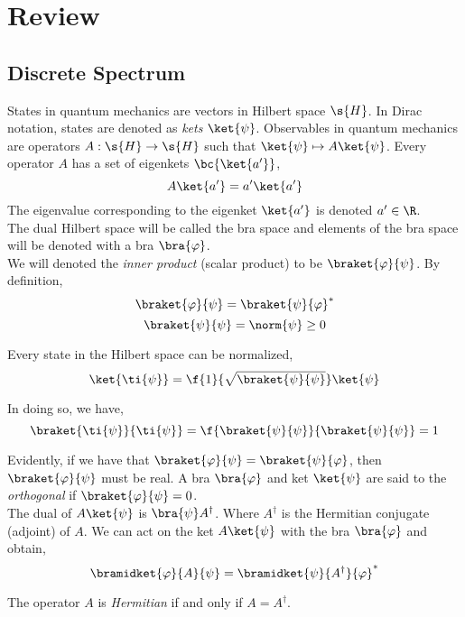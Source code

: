 \documentclass{article}
\begin{document}
\titlePage

\tableOfContents

\disclaimer

\section{Review}

\subsection{Discrete Spectrum}
States in quantum mechanics are vectors in Hilbert space $\s{H}$. In Dirac notation, states are denoted as \textit{kets} $\ket{\psi}$. Observables in quantum mechanics are operators $A : \s{H} \to \s{H}$ such that $\ket{\psi} \mapsto A \ket{\psi}$. Every operator $A$ has a set of eigenkets $\bc{\ket{a'}}$,
\[ A \ket{a'} = a' \ket{a'} \]
The eigenvalue corresponding to the eigenket $\ket{a'}$ is denoted $a' \in \R$. \\

The dual Hilbert space will be called the bra space and elements of the bra space will be denoted with a bra $\bra{\varphi}$.\\

We will denoted the \textit{inner product} (scalar product) to be $\braket{\varphi}{\psi}$. By definition,
\[ \braket{\varphi}{\psi} = \braket{\psi}{\varphi}^{*} \]
\[ \braket{\psi}{\psi} = \norm{\psi} \geq 0 \]

Every state in the Hilbert space can be normalized,
\[ \ket{\ti{\psi}} = \f{1}{\sqrt{\braket{\psi}{\psi}}} \ket{\psi} \]

In doing so, we have,
\[ \braket{\ti{\psi}}{\ti{\psi}} = \f{\braket{\psi}{\psi}}{\braket{\psi}{\psi}} = 1 \]

Evidently, if we have that $\braket{\varphi}{\psi} = \braket{\psi}{\varphi}$, then $\braket{\varphi}{\psi}$ must be real. A bra $\bra{\varphi}$ and ket $\ket{\psi}$ are said to the \textit{orthogonal} if $\braket{\varphi}{\psi} = 0$. \\

The dual of $A \ket{\psi}$ is $\bra{\psi} A^\dagger$. Where $A^{\dagger}$ is the Hermitian conjugate (adjoint) of $A$. We can act on the ket $A\ket{\psi}$ with the bra $\bra{\varphi}$ and obtain,
\[ \bramidket{\varphi}{A}{\psi} = \bramidket{\psi}{A^\dagger}{\varphi}^{*} \]

The operator $A$ is \textit{Hermitian} if and only if $A = A^{\dagger}$. \\
\end{document}
